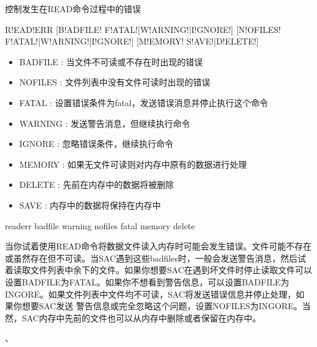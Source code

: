 \label{cmd:readerr}

控制发生在READ命令过程中的错误

\begin{SACSTX}
R!EAD!ERR [B!ADFILE! F!ATAL!|W!ARNING!|I!GNORE!] [N!OFILES! F!ATAL!|W!ARNING!|I!GNORE!] 
    [M!EMORY! S!AVE!|D!ELETE!]
\end{SACSTX}

\begin{itemize}
\item BADFILE : 当文件不可读或不存在时出现的错误 
\item NOFILES : 文件列表中没有文件可读时出现的错误 
\item FATAL : 设置错误条件为fatal，发送错误消息并停止执行这个命令 
\item WARNING : 发送警告消息，但继续执行命令 
\item IGNORE : 忽略错误条件，继续执行命令 
\item MEMORY : 如果无文件可读则对内存中原有的数据进行处理 
\item DELETE : 先前在内存中的数据将被删除 
\item SAVE : 内存中的数据将保持在内存中 
\end{itemize}

\begin{SACDFT}
readerr badfile warning nofiles fatal memory delete
\end{SACDFT}

当你试着使用READ命令将数据文件读入内存时可能会发生错误。文件可能不存在或虽然存在但不可读。当SAC遇到这些badfiles时，一般会发送警告消息，然后试着读取文件列表中余下的文件。如果你想要SAC在遇到坏文件时停止读取文件可以设置BADFILE为FATAL。如果你不想看到警告信息，可以设置BADFILE为INGORE。如果文件列表中文件均不可读，SAC将发送错误信息并停止处理，如果你想要SAC发送	警告信息或完全忽略这个问题，设置NOFILES为INGORE。当然，SAC内存中先前的文件也可以从内存中删除或者保留在内存中。

、
